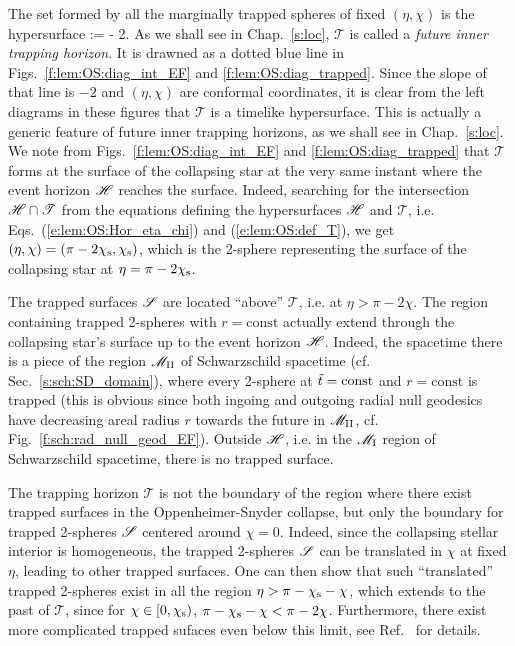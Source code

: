 The set formed by all the marginally trapped spheres of fixed $(\eta,\chi)$
is the hypersurface
\be \label{e:lem:OS:def_T}
    :\qquad \eta = \pi - 2\chi.
\ee
As we shall see in
Chap.~\ref{s:loc}, $\mathscr{T}$ is called a \emph{future inner trapping horizon}.
It is drawned as a dotted blue line in Figs.~\ref{f:lem:OS:diag_int_EF}
and \ref{f:lem:OS:diag_trapped}. Since the slope of that line is $-2$ and
$(\eta,\chi)$ are conformal coordinates, it is clear from the left diagrams
in these figures that $\mathscr{T}$ is a timelike hypersurface. This is
actually a generic feature of future inner trapping horizons, as we shall
see in Chap.~\ref{s:loc}. We note from Figs.~\ref{f:lem:OS:diag_int_EF}
and \ref{f:lem:OS:diag_trapped} that $\mathscr{T}$ forms at the surface of the
collapsing star at the very same instant where the event horizon $\mathscr{H}$
reaches the surface.
Indeed, searching for the intersection $\mathscr{H}\cap\mathscr{T}$ from the equations
defining the hypersurfaces $\mathscr{H}$ and $\mathscr{T}$, i.e. Eqs.~(\ref{e:lem:OS:Hor_eta_chi})
and (\ref{e:lem:OS:def_T}), we get
$(\eta,\chi) = (\pi - 2\chi_{\rm s}, \chi_{\rm s})$, which is the 2-sphere
representing the surface of the collapsing star at $\eta=\pi - 2 \chi_{\rm s}$.

The trapped surfaces $\mathscr{S}$ are located ``above'' $\mathscr{T}$, i.e. at
$\eta > \pi - 2 \chi$. The region containing trapped 2-spheres with $r=\mathrm{const}$ actually extend through the collapsing star's surface up to the event horizon $\mathscr{H}$. Indeed, the spacetime there
is a piece of the region $\mathscr{M}_{\rm II}$ of Schwarzschild spacetime (cf. Sec.~\ref{s:sch:SD_domain}),
where every 2-sphere at ${\tilde t} = \mathrm{const}$ and $r=\mathrm{const}$ is trapped (this is obvious
since both ingoing and outgoing radial null geodesics have decreasing areal radius $r$
towards the future in $\mathscr{M}_{\rm II}$, cf. Fig.~\ref{f:sch:rad_null_geod_EF}).
Outside $\mathscr{H}$, i.e. in the $\mathscr{M}_{\rm I}$ region of Schwarzschild spacetime, there is no trapped
surface.

\begin{remark}
The trapping horizon $\mathscr{T}$ is not the boundary of the region where there
exist trapped surfaces
in the Oppenheimer-Snyder collapse, but only the boundary for trapped 2-spheres $\mathscr{S}$
centered around $\chi=0$.
Indeed, since the collapsing stellar interior
is homogeneous, the trapped 2-spheres $\mathscr{S}$ can
be translated in $\chi$ at fixed $\eta$, leading to other trapped surfaces.
One can then show that such ``translated'' trapped 2-spheres exist in all the region
$\eta > \pi - \chi_{\rm s} - \chi$, which extends to the past of $\mathscr{T}$,
since for $\chi\in[0, \chi_{\rm s})$,  %
$ \pi - \chi_{\rm s} - \chi < \pi - 2\chi$.
Furthermore, there exist more complicated trapped sufaces even below
this limit, see Ref.~\cite{BengtJS13} for details.
\end{remark}



